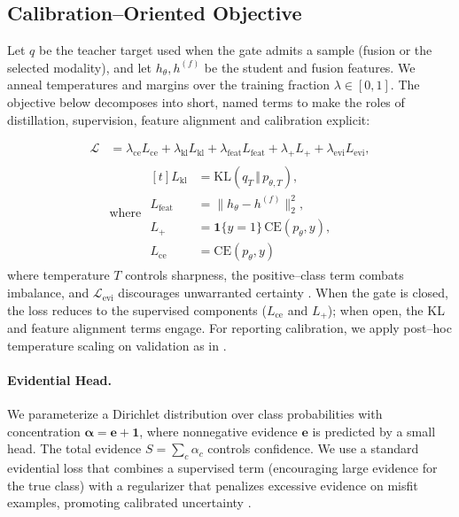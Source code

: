\subsection{Calibration–Oriented Objective}
Let $q$ be the teacher target used when the gate admits a sample (fusion or the selected modality), and let $h_\theta, h^{(f)}$ be the student and fusion features. We anneal temperatures and margins over the training fraction $\lambda\in[0,1]$. The objective below decomposes into short, named terms to make the roles of distillation, supervision, feature alignment and calibration explicit:

\begingroup\small
\begin{equation}\label{eq:obj}
\begin{split}
\mathcal{L}
  &= \lambda_{\mathrm{ce}} L_{\mathrm{ce}}
   + \lambda_{\mathrm{kl}} L_{\mathrm{kl}}
   + \lambda_{\mathrm{feat}} L_{\mathrm{feat}}
   + \lambda_{+} L_{+}
   + \lambda_{\mathrm{evi}} L_{\mathrm{evi}},\\[-2pt]
&\text{where } 
\begin{aligned}[t]
L_{\mathrm{kl}}   &= \mathrm{KL}\!\left(q_T \,\Vert\, p_{\theta,T}\right),\\
L_{\mathrm{feat}} &= \lVert h_{\theta}-h^{(f)}\rVert_2^{2},\\
L_{+}             &= \mathbf{1}\{y=1\}\,\mathrm{CE}(p_{\theta},y),\\
L_{\mathrm{ce}}   &= \mathrm{CE}(p_{\theta},y)
\end{aligned}
\end{split}
\end{equation}
\endgroup
where temperature $T$ controls sharpness, the positive–class term combats imbalance, and $\mathcal{L}_{\mathrm{evi}}$ discourages unwarranted certainty \citep{Sensoy2018EDL}. When the gate is closed, the loss reduces to the supervised components ($L_{\mathrm{ce}}$ and $L_{+}$); when open, the KL and feature alignment terms engage. For reporting calibration, we apply post–hoc temperature scaling on validation as in \citet{Guo2017Calibration}.

\paragraph{Evidential Head.} We parameterize a Dirichlet distribution over class probabilities with concentration $\boldsymbol{\alpha}=\boldsymbol{e}+\mathbf{1}$, where nonnegative evidence $\boldsymbol{e}$ is predicted by a small head. The total evidence $S=\sum_c \alpha_c$ controls confidence. We use a standard evidential loss that combines a supervised term (encouraging large evidence for the true class) with a regularizer that penalizes excessive evidence on misfit examples, promoting calibrated uncertainty \citep{Sensoy2018EDL}.

